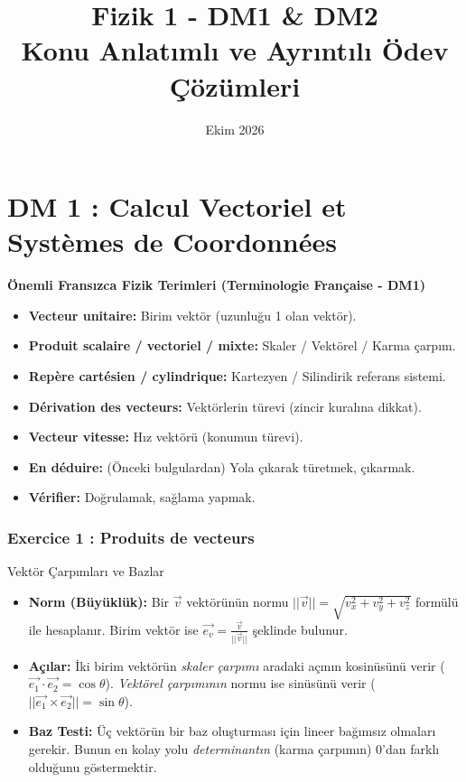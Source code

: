 \documentclass[11pt,a4paper]{article}
\title{\textcolor{myblue}{\Huge\textbf{Fizik 1 - DM1 \& DM2}}\\[0.3cm]
\Large\textbf{Konu Anlatımlı ve Ayrıntılı Ödev Çözümleri}}
\author{}
\date{Ekim 2026}
\begin{document}
\maketitle
\tableofcontents
\newpage

\part*{DM 1 : Calcul Vectoriel et Systèmes de Coordonnées}

\begin{terimbox}{\textbf{Önemli Fransızca Fizik Terimleri (Terminologie Française - DM1)}}
\begin{itemize}
    \item \textbf{Vecteur unitaire:} Birim vektör (uzunluğu 1 olan vektör).
    \item \textbf{Produit scalaire / vectoriel / mixte:} Skaler / Vektörel / Karma çarpım.
    \item \textbf{Repère cartésien / cylindrique:} Kartezyen / Silindirik referans sistemi.
    \item \textbf{Dérivation des vecteurs:} Vektörlerin türevi (zincir kuralına dikkat).
    \item \textbf{Vecteur vitesse:} Hız vektörü (konumun türevi).
    \item \textbf{En déduire:} (Önceki bulgulardan) Yola çıkarak türetmek, çıkarmak.
    \item \textbf{Vérifier:} Doğrulamak, sağlama yapmak.
\end{itemize}
\end{terimbox}

\vspace{0.5cm}

\section*{Exercice 1 : Produits de vecteurs}

\begin{theoriebox}{Vektör Çarpımları ve Bazlar}
\begin{itemize}
    \item \textbf{Norm (Büyüklük):} Bir $\vec{v}$ vektörünün normu $||\vec{v}|| = \sqrt{v_x^2 + v_y^2 + v_z^2}$ formülü ile hesaplanır. Birim vektör ise $\vec{e_v} = \frac{\vec{v}}{||\vec{v}||}$ şeklinde bulunur.
    \item \textbf{Açılar:} İki birim vektörün \textit{skaler çarpımı} aradaki açının kosinüsünü verir ($\vec{e_1} \cdot \vec{e_2} = \cos\theta$). \textit{Vektörel çarpımının} normu ise sinüsünü verir ($||\vec{e_1} \times \vec{e_2}|| = \sin\theta$).
    \item \textbf{Baz Testi:} Üç vektörün bir baz oluşturması için lineer bağımsız olmaları gerekir. Bunun en kolay yolu \textit{determinantın} (karma çarpımın) $0$'dan farklı olduğunu göstermektir.
\end{itemize}
\end{theoriebox}
\end{document}
